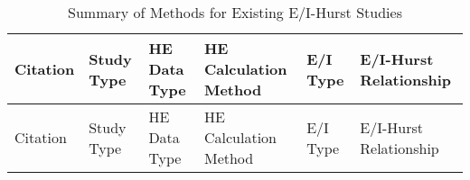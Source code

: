 \documentclass[
true
]{sn-jnl}
\begin{document}
\begin{longtable}[]{@{}
  >{\raggedright\arraybackslash}p{}
  >{\raggedright\arraybackslash}p{}
  >{\raggedright\arraybackslash}p{}
  >{\raggedright\arraybackslash}p{}
  >{\raggedright\arraybackslash}p{}
  >{\raggedright\arraybackslash}p{}@{}}
\caption{Summary of Methods for Existing E/I-Hurst
Studies}\label{tbl-lit}\tabularnewline
\toprule\noalign{}
\begin{minipage}[b]{\linewidth}\raggedright
Citation
\end{minipage} & \begin{minipage}[b]{\linewidth}\raggedright
Study Type
\end{minipage} & \begin{minipage}[b]{\linewidth}\raggedright
HE Data Type
\end{minipage} & \begin{minipage}[b]{\linewidth}\raggedright
HE Calculation Method
\end{minipage} & \begin{minipage}[b]{\linewidth}\raggedright
E/I Type
\end{minipage} & \begin{minipage}[b]{\linewidth}\raggedright
E/I-Hurst Relationship
\end{minipage} \\
\midrule\noalign{}
\endfirsthead
\toprule\noalign{}
\begin{minipage}[b]{\linewidth}\raggedright
Citation
\end{minipage} & \begin{minipage}[b]{\linewidth}\raggedright
Study Type
\end{minipage} & \begin{minipage}[b]{\linewidth}\raggedright
HE Data Type
\end{minipage} & \begin{minipage}[b]{\linewidth}\raggedright
HE Calculation Method
\end{minipage} & \begin{minipage}[b]{\linewidth}\raggedright
E/I Type
\end{minipage} & \begin{minipage}[b]{\linewidth}\raggedright
E/I-Hurst Relationship
\end{minipage} \\

\end{longtable}
\end{document}

